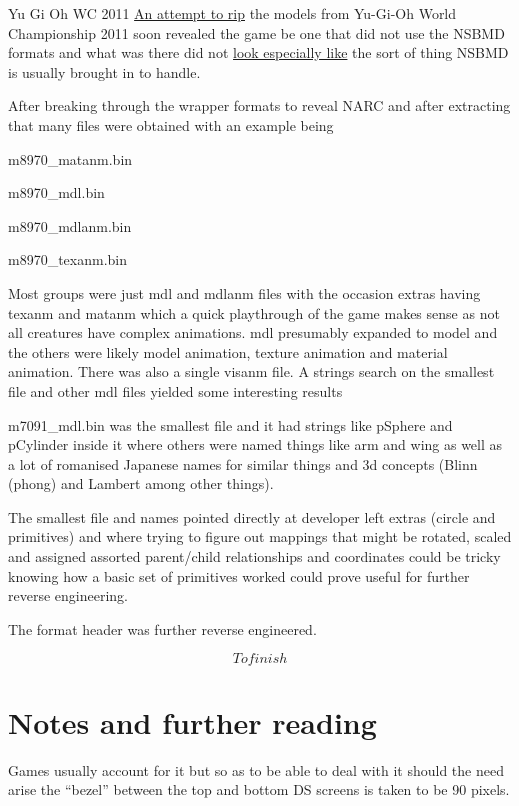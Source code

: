 \documentclass[
]{book}
\begin{document}
Yu Gi Oh WC 2011 \href{http://gbatemp.net/topic/322715-yu-gi-oh-world-championship-2011-model-ripping/}{An attempt to rip} the models from Yu-Gi-Oh World Championship 2011 soon revealed the game be one that did not use the NSBMD formats and what was there did not \href{http://www.youtube.com/watch?\&v=ccqzbFvC3Vg}{look especially like} the sort of thing NSBMD is usually brought in to handle.

After breaking through the wrapper formats to reveal NARC and after extracting that many files were obtained with an example being

m8970\_matanm.bin

m8970\_mdl.bin

m8970\_mdlanm.bin

m8970\_texanm.bin

Most groups were just mdl and mdlanm files with the occasion extras having texanm and matanm which a quick playthrough of the game makes sense as not all creatures have complex animations. mdl presumably expanded to model and the others were likely model animation, texture animation and material animation. There was also a single visanm file. A strings search on the smallest file and other mdl files yielded some interesting results

m7091\_mdl.bin was the smallest file and it had strings like pSphere and pCylinder inside it where others were named things like arm and wing as well as a lot of romanised Japanese names for similar things and 3d concepts (Blinn (phong) and Lambert among other things).

The smallest file and names pointed directly at developer left extras (circle and primitives) and where trying to figure out mappings that might be rotated, scaled and assigned assorted parent/child relationships and coordinates could be tricky knowing how a basic set of primitives worked could prove useful for further reverse engineering.

The format header was further reverse engineered.

\[To finish\]

\hypertarget{notes-and-further-reading}{%
\section{Notes and further reading}\label{notes-and-further-reading}}

Games usually account for it but so as to be able to deal with it should the need arise the ``bezel'' between the top and bottom DS screens is taken to be 90 pixels.
\end{document}
